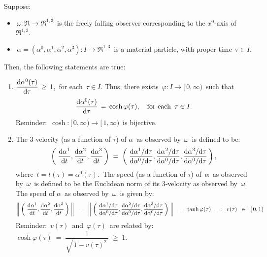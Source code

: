 \vskip 0.4cm
\begin{proposition}
\mbox{}
\vskip -0.01cm
\noindent
Suppose:
\begin{itemize}
\item
	\,$\omega : \Re \longrightarrow \Re^{1,3}$\, is the freely falling observer
	corresponding to the $x^{0}$-axis of \,$\Re^{1,3}$.\,
\item
	\,$\alpha = (\alpha^{0},\alpha^{1},\alpha^{2},\alpha^{3}) : I \longrightarrow \Re^{1,3}$\, is a material particle,
	with proper time \,$\tau \in I$.
\end{itemize}
Then, the following statements are true:
\begin{enumerate}
\item
	$\dfrac{\textnormal{d}\alpha^{0}(\tau)}{\textnormal{d}\tau} \,\geq\, 1$,\, for each \,$\tau \in I$.
	Thus, there exists \,$\varphi : I \longrightarrow [\,0,\infty)$\,
	such that
	\begin{equation*}
	\dfrac{\textnormal{d}\alpha^{0}(\tau)}{\textnormal{d}\tau} \, = \, \cosh\varphi(\tau),
	\quad
	\textnormal{for each \,$\tau \in I$}.
	\end{equation*}
	Reminder: \,$\cosh : [\,0,\infty) \longrightarrow [\,1,\infty)$\, is bijective.
\item
	The $3$-velocity (as a function of $\tau$) of \;$\alpha$\, as observed by \,$\omega$\, is {\color{red}defined} to be:
	\begin{equation*}
	\left(\;
		\dfrac{\textnormal{d}\alpha^{1}}{\textnormal{d} t},
		\dfrac{\textnormal{d}\alpha^{2}}{\textnormal{d} t},
		\dfrac{\textnormal{d}\alpha^{3}}{\textnormal{d} t}
		\,\right)
	\; = \;
	\left(\;
		\dfrac{\textnormal{d}\alpha^{1}/\textnormal{d}\tau}{\textnormal{d}\alpha^{0}/\textnormal{d}\tau},
		\dfrac{\textnormal{d}\alpha^{2}/\textnormal{d}\tau}{\textnormal{d}\alpha^{0}/\textnormal{d}\tau},
		\dfrac{\textnormal{d}\alpha^{3}/\textnormal{d}\tau}{\textnormal{d}\alpha^{0}/\textnormal{d}\tau}
		\,\right),
	\end{equation*}
	where \,$t = t(\tau) = \alpha^{0}(\tau)$.\,
	The speed (as a function of $\tau$) of \,$\alpha$\, as observed by \,$\omega$\, is defined to be
	the Euclidean norm of its 3-velocity as observed by \,$\omega$.\,
	The speed of \;$\alpha$\, as observed by \,$\omega$\, is given by:
	\begin{equation*}
	\left\Vert\;\left(\;
		\dfrac{\textnormal{d}\alpha^{1}}{\textnormal{d} t},
		\dfrac{\textnormal{d}\alpha^{2}}{\textnormal{d} t},
		\dfrac{\textnormal{d}\alpha^{3}}{\textnormal{d} t}
		\,\right)\;\right\Vert
	\;\; = \;\;
	\left\Vert\;\left(\;
		\dfrac{\textnormal{d}\alpha^{1}/\textnormal{d}\tau}{\textnormal{d}\alpha^{0}/\textnormal{d}\tau},
		\dfrac{\textnormal{d}\alpha^{2}/\textnormal{d}\tau}{\textnormal{d}\alpha^{0}/\textnormal{d}\tau},
		\dfrac{\textnormal{d}\alpha^{3}/\textnormal{d}\tau}{\textnormal{d}\alpha^{0}/\textnormal{d}\tau}
		\,\right)\;\right\Vert
	\;\; = \;\;
		\tanh\varphi(\tau)
	\;\; =: \;\;
		v(\tau)
	\;\; \in \;\;
		[\,0,1)
	\end{equation*}
	Reminder: \,$v(\tau)$\, and \,$\varphi(\tau)$\, are related by:
	\,$\cosh\varphi(\tau) \; = \; \dfrac{1}{\sqrt{\,1 - v(\tau)^{2}\,}} \; \geq \; 1$.
\end{enumerate}
\end{proposition}

